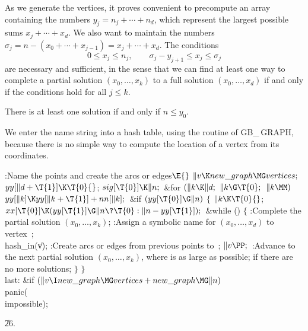 As we generate the vertices, it proves convenient to precompute an
array containing the numbers $y_j=n_j+\cdots+n_d$, which represent the
largest possible sums $x_j+\cdots+x_d$. We also want to maintain
the numbers $\sigma_j=n-(x_0+\cdots+x_{j-1})=x_j+\cdots+x_d$. The
conditions
$$0\le x_j\le n_j, \qquad \sigma_j-y_{j+1}\le x_j\le \sigma_j$$
are necessary and sufficient, in the sense that we can find at least
one way to complete a partial solution $(x_0,\ldots,x_k)$ to a full
solution $(x_0,\ldots,x_d)$ if and only if the conditions hold for
all $j\le k$.

There is at least one solution if and only if $n\le y_0$.

We enter the name string into a hash table, using the 
routine of {\sc GB\_\,GRAPH}, because there is no simple way to compute the
location of a vertex from its coordinates.

\Y\B\4:Name the points and create the arcs or edges\X${}\E{}$\6
$\|v\K\\{new\_graph}\MG\\{vertices};{}$\6
${}\\{yy}[\|d+\T{1}]\K\T{0}{}$;\5
${}\\{sig}[\T{0}]\K\|n;{}$\6
\&{for} ${}(\|k\K\|d;{}$ ${}\|k\G\T{0};{}$ ${}\|k\MM){}$\1\5
${}\\{yy}[\|k]\K\\{yy}[\|k+\T{1}]+\\{nn}[\|k];{}$\2\6
\&{if} ${}(\\{yy}[\T{0}]\G\|n){}$\5
${}\{{}$\1\6
${}\|k\K\T{0}{}$;\5
${}\\{xx}[\T{0}]\K(\\{yy}[\T{1}]\G\|n\?\T{0}:\|n-\\{yy}[\T{1}]);{}$\6
\&{while} ()\5
${}\{{}$\1\6
:Complete the partial solution $(x_0,\ldots,x_k)$\X;\6
:Assign a symbolic name for $(x_0,\ldots,x_d)$ to vertex~\X;\6
\\{hash\_in}(\|v);\6
:Create arcs or edges from previous points to~\X;\6
${}\|v\PP;{}$\6
:Advance to the next partial solution $(x_0,\ldots,x_k)$, where  is
as large as possible;  if there are no more solutions\X;\6
\4${}\}{}$\2\6
\4${}\}{}$\2\6
\4\\{last}:\5
\&{if} ${}(\|v\I\\{new\_graph}\MG\\{vertices}+\\{new\_graph}\MG\|n){}$\1\5
\\{panic}(\\{impossible});\2\par
\U26.\fi

